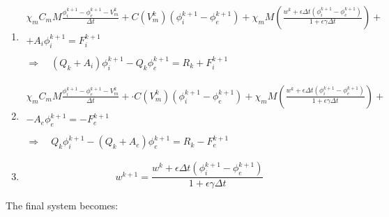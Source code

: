 \documentclass[a4paper,11pt]{article}
\begin{document}
\begin{enumerate}
\item
\begin{equation*}
\begin{gathered}
\chi_m C_m M \frac{	\phi_i^{k+1}-\phi_e^{k+1}-V_m^{k}}{\Delta t} +  C(V_m^k) (\phi_i^{k+1}-\phi_e^{k+1}) + \chi_m M \left(\frac{w^k + \epsilon \Delta t (\phi_i^{k+1}-\phi_e^{k+1})}{1+\epsilon \gamma \Delta t}   \right)+\\
+ A_i \phi_i ^{k+1} = F_i^{k+1} \\ \\
\Rightarrow \quad (Q_k + A_i) \phi_i^{k+1} - Q_k \phi_e^{k+1} =R_k +  F_i^{k+1}
\end{gathered}
\end{equation*}
\item
\begin{equation*}
\begin{gathered}
\chi_m C_m M \frac{	\phi_i^{k+1}-\phi_e^{k+1}-V_m^{k}}{\Delta t} + \cdot C(V_m^k) (\phi_i^{k+1}-\phi_e^{k+1}) + \chi_m M \left(\frac{w^k + \epsilon \Delta t (\phi_i^{k+1}-\phi_e^{k+1})}{1+\epsilon \gamma \Delta t}   \right) +\\
- A_e \phi_e ^{k+1} = -F_e^{k+1} \\ \\
\Rightarrow \quad Q_k \phi_i^{k+1} - (Q_k+A_e) \phi_e^{k+1} =R_k - F_e^{k+1}
\end{gathered}
\end{equation*}
\item 
\begin{equation*}
w^{k+1} = \frac{w^k + \epsilon \Delta t (\phi_i^{k+1}-\phi_e^{k+1})}{1+\epsilon \gamma \Delta t}
\end{equation*}
\end{enumerate}
\vspace{4mm}
The final system becomes:
\end{document}
